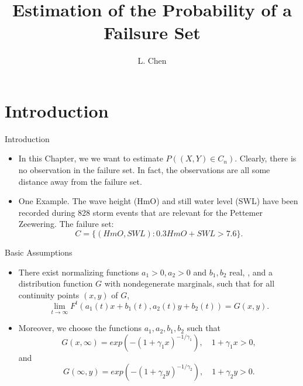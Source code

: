 \documentclass[11pt]{beamer}
\author{L. Chen}
\title{Estimation of the Probability of a Failsure Set}
\institute{Fudan University}
\begin{document}
\begin{frame}
\titlepage
\end{frame}




\section{Introduction}
\begin{frame}{Introduction}
\begin{itemize}
\item In this Chapter, we we want to estimate $P((X,Y)\in C_n)$. Clearly, there is no observation in the failure set. In fact, the observations are all some distance away from
the failure set.
\item One Example. The wave height (HmO) and still water level (SWL) have
been recorded during 828 storm events that are relevant for the Pettemer Zeewering. The failure set:
\begin{displaymath}
C=\{ (HmO,SWL): 0.3HmO + SWL > 7.6\}.
\end{displaymath}
\end{itemize}
\end{frame}


\begin{frame}{Basic Assumptions}
\begin{itemize}
\item There exist normalizing functions $a_1>0,a_2>0$ and $b_1, b_2$ real, , and a distribution function $G$ with nondegenerate marginals, such that for all continuity points $(x,y)$ of $G$,
$$\lim_{t \to \infty} F^t(a_1(t)x+b_1(t),a_2(t)y+b_2(t))=G(x,y).$$
\item Moreover, we choose the functions $a_1,a_2,b_1,b_2$ such that
\begin{displaymath}
G(x,\infty)=exp(-(1+\gamma_1x)^{-1/\gamma_1}), \quad 1+\gamma_1 x>0,
\end{displaymath}
and
\begin{displaymath}
G(\infty,y)=exp(-(1+\gamma_2y)^{-1/\gamma_2}), \quad 1+\gamma_2 y>0.
\end{displaymath}
\end{itemize}
\end{frame}
\end{document}

